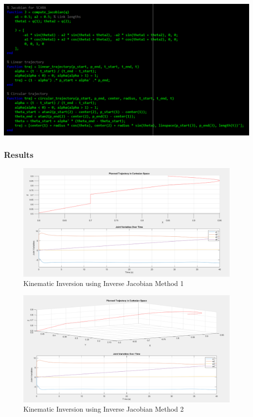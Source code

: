 \documentclass[12pt]{report}
\begin{document}
		\\
		\includegraphics[scale = 0.71]{C4}
		
			\subsubsection{Results}
		\begin{figure}[H]
			\centering
			\includegraphics[scale=0.5]{R7} %
			\caption{Kinematic Inversion using Inverse Jacobian Method 1}
			\label{run10} %
		\end{figure}
		\begin{figure}[H]
			\centering
			\includegraphics[scale=0.5]{R5} %
			\caption{Kinematic Inversion using Inverse Jacobian Method 2}
			\label{run} %
		\end{figure}
\end{document}
